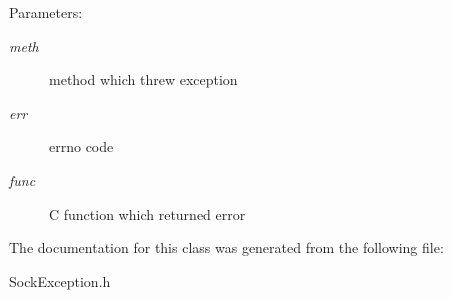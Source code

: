 \begin{Desc}
\item[Parameters:]
\begin{description}
\item[{\em meth}]method which threw exception \item[{\em err}]errno code \item[{\em func}]C function which returned error \end{description}
\end{Desc}


The documentation for this class was generated from the following file:\begin{CompactItemize}
\item 
SockException.h\end{CompactItemize}

